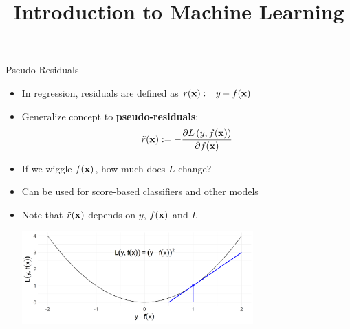 \documentclass[11pt,compress,t,notes=noshow, xcolor=table]{beamer}
\title{Introduction to Machine Learning}
\begin{document}
    

\begin{vbframe}{Pseudo-Residuals}

\begin{itemize}
\item In regression, residuals are defined as 
$r(\mathbf{x}) := y - f(\mathbf{x})$
\item Generalize concept to \textbf{pseudo-residuals}: 
$$
\tilde{r}(\mathbf{x}) := - \frac{\partial L\left(y, f(\mathbf{x})\right)}{\partial f(\mathbf{x})}
$$
\item If we wiggle $f(\mathbf{x})$, how much does $L$ change?
\item Can be used for score-based classifiers and other models
\item Note that $\tilde{r}(\mathbf{x})$ depends on $y$, $f(\mathbf{x})$ and $L$

\vfill

\includegraphics[width=0.7\textwidth]{figure/plot_quad_pseudores.png}

\end{itemize}

\end{vbframe}
\end{document}
